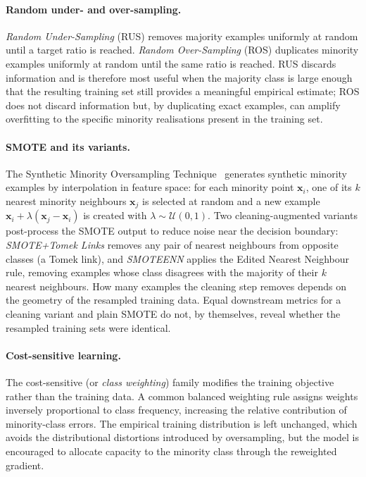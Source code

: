 \paragraph{Random under- and over-sampling.}
\emph{Random Under-Sampling} (RUS) removes majority examples uniformly at
random until a target ratio is reached. \emph{Random Over-Sampling} (ROS)
duplicates minority examples uniformly at random until the same ratio is
reached. RUS discards information and is therefore most useful when the
majority class is large enough that the resulting training set still provides
a meaningful empirical estimate; ROS does not discard information but, by
duplicating exact examples, can amplify overfitting to the specific minority
realisations present in the training set.

\paragraph{SMOTE and its variants.}
The Synthetic Minority Oversampling Technique~\cite{chawla2002smote}
generates synthetic minority examples by interpolation in feature space: for
each minority point $\mathbf{x}_i$, one of its $k$ nearest minority neighbours
$\mathbf{x}_{j}$ is selected at random and a new example
$\mathbf{x}_i + \lambda(\mathbf{x}_j - \mathbf{x}_i)$ is created with
$\lambda \sim \mathcal{U}(0,1)$. Two cleaning-augmented variants
\cite{batista2004balancing} post-process the SMOTE output to reduce noise
near the decision boundary: \emph{SMOTE+Tomek Links} removes any pair of
nearest neighbours from opposite classes (a Tomek link), and \emph{SMOTEENN}
applies the Edited Nearest Neighbour rule, removing examples whose class
disagrees with the majority of their $k$ nearest neighbours. How many examples
the cleaning step removes depends on the geometry of the resampled training
data. Equal downstream metrics for a cleaning variant and plain SMOTE do not,
by themselves, reveal whether the resampled training sets were identical.

\paragraph{Cost-sensitive learning.}
The cost-sensitive (or \emph{class weighting}) family modifies the training
objective rather than the training data. A common balanced weighting rule
assigns weights inversely proportional to class frequency, increasing the
relative contribution of minority-class errors. The
empirical training distribution is left unchanged, which avoids the
distributional distortions introduced by oversampling, but the model is
encouraged to allocate capacity to the minority class through the reweighted
gradient.

